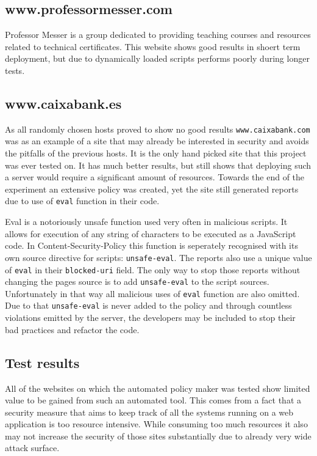 
\subsection{www.professormesser.com}

Professor Messer is a group dedicated to providing teaching courses and resources related to technical certificates.
This website shows good results in shoert term deployment, but due to dynamically loaded scripts performs poorly during longer tests.


\subsection{www.caixabank.es}

As all randomly chosen hosts proved to show no good results \texttt{www.caixabank.com} was as an example of a site that may already be interested in security and avoids the pitfalls of the previous hosts.
It is the only hand picked site that this project was ever tested on. 
It has much better results, but still shows that deploying such a server would require a significant amount of resources.
Towards the end of the experiment an extensive policy was created, yet the site still generated reports due to use of \texttt{eval} function in their code.

Eval is a notoriously unsafe function used very often in malicious scripts. 
It allows for execution of any string of characters to be executed as a JavaScript code. 
In Content-Security-Policy this function is seperately recognised with its own source directive for scripts: \texttt{unsafe-eval}.
The reports also use a unique value of \texttt{eval} in their \texttt{blocked-uri} field.
The only way to stop those reports without changing the pages source is to add \texttt{unsafe-eval} to the script sources.
Unfortunately in that way all malicious uses of \texttt{eval} function are also omitted.
Due to that \texttt{unsafe-eval} is never added to the policy and through countless violations emitted by the server, the developers may be included to stop their bad practices and refactor the code.

\subsection{Test results}

All of the websites on which the automated policy maker was tested show limited value to be gained from such an automated tool.
This comes from a fact that a security measure that aims to keep track of all the systems running on a web application is too resource intensive.
While consuming too much resources it also may not increase the security of those sites substantially due to already very wide attack surface.


